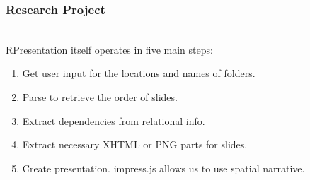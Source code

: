 \begin{frame}
  \frametitle{Research Project}
  \begin{module}[id=researchProject]\\
\noindent
RPresentation itself operates in five main steps:
\begin{enumerate}
\item Get user input for the locations and names of folders.
\vspace{-4mm}
\item Parse \sTeX to retrieve the order of slides.
\vspace{-4mm}
\item Extract dependencies from relational info.
\vspace{-4mm}
\item Extract necessary XHTML or PNG parts for slides.
\vspace{-4mm}
\item Create presentation. impress.js allows us to use spatial narrative.
\end{enumerate}


\end{module}
\end{frame}
